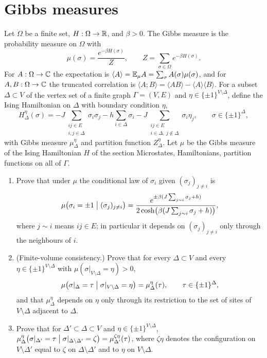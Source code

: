 \section{Gibbs measures}

\begin{exercise}
Let $\Omega$ be a finite set, $H:\Omega\to\mathbb R$, and $\beta>0$.  The Gibbs
measure is the probability measure on $\Omega$ with
\[
 \mu(\sigma)=\frac{e^{-\beta H(\sigma)}}{Z},\qquad Z=\sum_{\sigma\in\Omega}e^{-\beta H(\sigma)} .
\]
For $A:\Omega\to\mathbb C$ the expectation is
$\langle A\rangle=\mathbb E_\mu A=\sum_\sigma A(\sigma)\mu(\sigma)$, and for
$A,B:\Omega\to\mathbb C$ the truncated correlation is
$\langle A;B\rangle=\langle AB\rangle-\langle A\rangle\langle B\rangle$.
For a subset $\Delta\subset V$ of the vertex set of a finite graph
$\Gamma=(V,E)$ and $\eta\in\{\pm1\}^{V\setminus\Delta}$, define the Ising
Hamiltonian on $\Delta$ with boundary condition $\eta$,
\[
 H^\eta_\Delta(\sigma)=-J\sum_{\substack{ij\in E\\ i,j\in\Delta}}\sigma_i\sigma_j
 -h\sum_{i\in\Delta}\sigma_i
 -J\sum_{\substack{ij\in E\\ i\in\Delta,\ j\notin\Delta}}\sigma_i\eta_j,
 \qquad \sigma\in\{\pm1\}^\Delta,
\]
with Gibbs measure $\mu^\eta_\Delta$ and partition function $Z^\eta_\Delta$.
Let $\mu$ be the Gibbs measure of the Ising Hamiltonian $H$ of the section
Microstates, Hamiltonians, partition functions on all of $\Gamma$.
\begin{enumerate}[label=(\alph*)]
\item Prove that under $\mu$ the conditional law of $\sigma_i$ given
$(\sigma_j)_{j\ne i}$ is
\[
 \mu\bigl(\sigma_i=\pm1\bigm|(\sigma_j)_{j\ne i}\bigr)
 =\frac{e^{\pm\beta(J\sum_{j\sim i}\sigma_j+h)}}
 {2\cosh\bigl(\beta(J\sum_{j\sim i}\sigma_j+h)\bigr)},
\]
where $j\sim i$ means $ij\in E$; in particular it depends on
$(\sigma_j)_{j\ne i}$ only through the neighbours of $i$.
\item (Finite-volume consistency.)  Prove that for every
$\Delta\subset V$ and every $\eta\in\{\pm1\}^{V\setminus\Delta}$ with
$\mu(\sigma|_{V\setminus\Delta}=\eta)>0$,
\[
 \mu\bigl(\sigma|_\Delta=\tau\bigm|\sigma|_{V\setminus\Delta}=\eta\bigr)
 =\mu^\eta_\Delta(\tau),\qquad\tau\in\{\pm1\}^\Delta ,
\]
and that $\mu^\eta_\Delta$ depends on $\eta$ only through its restriction to
the set of sites of $V\setminus\Delta$ adjacent to $\Delta$.
\item Prove that for $\Delta'\subset\Delta\subset V$ and
$\eta\in\{\pm1\}^{V\setminus\Delta}$,
$\mu^\eta_\Delta\bigl(\sigma|_{\Delta'}=\tau\bigm|\sigma|_{\Delta\setminus\Delta'}=\zeta\bigr)
=\mu^{\zeta\eta}_{\Delta'}(\tau)$, where $\zeta\eta$ denotes the
configuration on $V\setminus\Delta'$ equal to $\zeta$ on
$\Delta\setminus\Delta'$ and to $\eta$ on $V\setminus\Delta$.
\end{enumerate}
\end{exercise}

